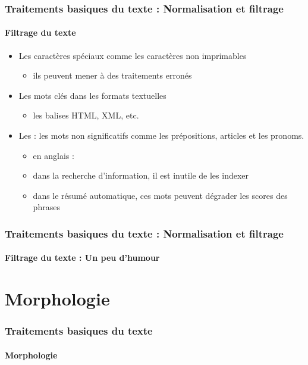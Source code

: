 \documentclass[xcolor=table]{beamer}
\begin{document}
\begin{frame}
\frametitle{Traitements basiques du texte : Normalisation et filtrage}
\framesubtitle{Filtrage du texte}

\begin{itemize}
	\item Les caractères spéciaux comme les caractères non imprimables
	\begin{itemize}
		\item ils peuvent mener à des traitements erronés 
	\end{itemize}
	\item Les mots clés dans les formats textuelles
	\begin{itemize}
		\item les balises HTML, XML, etc. 
	\end{itemize}
	\item Les  : les mots non significatifs comme les prépositions, articles et les pronoms.
	\begin{itemize}
		\item en anglais : 
		\item dans la recherche d'information, il est inutile de les indexer
		\item dans le résumé automatique, ces mots peuvent dégrader les scores des phrases
	\end{itemize}
\end{itemize}

\end{frame}

\begin{frame}
\frametitle{Traitements basiques du texte : Normalisation et filtrage}
\framesubtitle{Filtrage du texte : Un peu d'humour}

\begin{center}
\end{center}

\end{frame}

\section{Morphologie}

\begin{frame}
\frametitle{Traitements basiques du texte}
\framesubtitle{Morphologie}


\end{frame}
\end{document}
